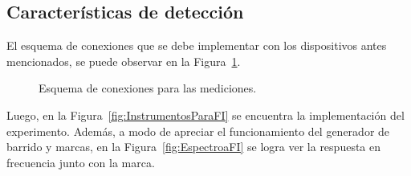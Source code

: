   \subsection{Características de detección}

    El esquema de conexiones que se debe implementar con los dispositivos antes mencionados, se puede observar en
    la Figura~\ref{fig:EsquemaConexiones}. 

    \begin{figure}[H]
      \centering
      \caption{Esquema de conexiones para las mediciones.}
      \label{fig:EsquemaConexiones}
    \end{figure}

    Luego, en la Figura~\ref{fig:InstrumentosParaFI} se encuentra la implementación del experimento. Además, a 
    modo de apreciar el funcionamiento del generador de barrido y marcas, en la Figura~\ref{fig:EspectroaFI} se 
    logra ver la respuesta en frecuencia junto con la marca.

